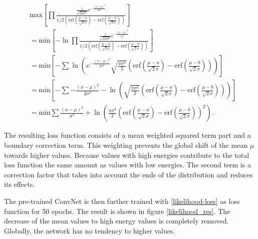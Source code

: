 \documentclass[12pt, a4paper]{thesis}
\begin{document}
\begin{align}
&\text{max}\left[ \prod \frac{\frac{1}{\sqrt{2\pi \sigma^2}}
      e^{-\frac{(x-\mu)^2}{2
          \sigma^2}}}{1/2\left(\text{erf}\left(\frac{\mu-a}{\sqrt{2}\sigma}\right)
      - \text{erf}\left(\frac{\mu-b}{\sqrt{2}\sigma}\right)\right)}
    \right]\\ &=\text{min}\left[ -\ln \prod \frac{\frac{1}{\sqrt{2\pi
          \sigma^2}} e^{-\frac{(x-\mu)^2}{2
          \sigma^2}}}{1/2\left(\text{erf}\left(\frac{\mu-a}{\sqrt{2}\sigma}\right)
      -
      \text{erf}\left(\frac{\mu-b}{\sqrt{2}\sigma}\right)\right)}\right]
  \\ &=\text{min}\left[ -\sum \ln(e^{-\frac{(x-\mu)^2}{2
        \sigma^2}}{\sqrt{\frac{\pi
          \sigma^2}{2}}\left(\text{erf}\left(\frac{\mu-a}{\sqrt{2}\sigma}\right)
      -
      \text{erf}\left(\frac{\mu-b}{\sqrt{2}\sigma}\right)\right)})\right]
  \\ &=\text{min}\left[ -\sum -\frac{(x-\mu)^2}{2
      \sigma^2}-\ln(\sqrt{\frac{\pi
        \sigma^2}{2}}\left(\text{erf}\left(\frac{\mu-a}{\sqrt{2}\sigma}\right)
    -
    \text{erf}\left(\frac{\mu-b}{\sqrt{2}\sigma}\right)\right))\right]
  \\ &=\text{min} \sum \frac{(x-\mu)^2}{\sigma^2} + \ln(\frac{\pi
    \sigma^2}{2}\left(\text{erf}\left(\frac{\mu-a}{\sqrt{2}\sigma}\right)
  -
  \text{erf}\left(\frac{\mu-b}{\sqrt{2}\sigma}\right)\right)^2). \label{likelihood-loss}
\end{align}


The resulting loss function consists of a mean weighted squared term
part and a boundary correction term. This weighting prevents the
global shift of the mean $\mu$ towards higher values. Because values
with high energies contribute to the total loss function the same
amount as values with low energies. The second term is a correction
factor that takes into account the ends of the distribution and
reduces its effects.

  The pre-trained ConvNet is then further trained with
\eqref{likelihood-loss} as loss function for 50 epochs. The result is
shown in figure \ref{likelihood_res}. The decrease of the mean values
to high energy values is completely removed. Globally, the network has
no tendency to higher values.
\end{document}
